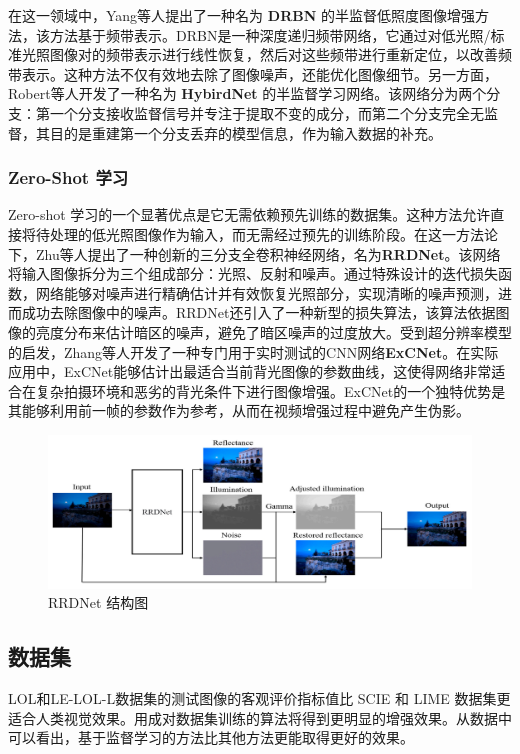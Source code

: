 \documentclass[a4paper]{ctexart}
\begin{document}
	在这一领域中，Yang等人\cite{qiao2021deep}提出了一种名为 \textbf{DRBN} 的半监督低照度图像增强方法，该方法基于频带表示。DRBN是一种深度递归频带网络，它通过对低光照/标准光照图像对的频带表示进行线性恢复，然后对这些频带进行重新定位，以改善频带表示。这种方法不仅有效地去除了图像噪声，还能优化图像细节。另一方面，Robert等人开发了一种名为 \textbf{HybirdNet} 的半监督学习网络\cite{robert2018hybridnet}。该网络分为两个分支：第一个分支接收监督信号并专注于提取不变的成分，而第二个分支完全无监督，其目的是重建第一个分支丢弃的模型信息，作为输入数据的补充。
	
	\subsubsection{Zero-Shot 学习}
	
	Zero-shot 学习的一个显著优点是它无需依赖预先训练的数据集。这种方法允许直接将待处理的低光照图像作为输入，而无需经过预先的训练阶段。在这一方法论下，Zhu等人\cite{zhu2020zero}提出了一种创新的三分支全卷积神经网络，名为\textbf{RRDNet}。该网络将输入图像拆分为三个组成部分：光照、反射和噪声。通过特殊设计的迭代损失函数，网络能够对噪声进行精确估计并有效恢复光照部分，实现清晰的噪声预测，进而成功去除图像中的噪声。RRDNet还引入了一种新型的损失算法，该算法依据图像的亮度分布来估计暗区的噪声，避免了暗区噪声的过度放大。受到超分辨率模型的启发，Zhang等人\cite{zhang2019zero}开发了一种专门用于实时测试的CNN网络\textbf{ExCNet}。在实际应用中，ExCNet能够估计出最适合当前背光图像的参数曲线，这使得网络非常适合在复杂拍摄环境和恶劣的背光条件下进行图像增强。ExCNet的一个独特优势是其能够利用前一帧的参数作为参考，从而在视频增强过程中避免产生伪影。
	
	\begin{figure}[htb]
		\centering 
		\includegraphics[width=0.7\columnwidth]{picture/LLIE/RRDNet/RRDNet}
		\caption{
			\label{fig: RRDNet} 
			RRDNet 结构图
		}
	\end{figure}
	
	\subsection{数据集}
	
	LOL\cite{wei2018deep}和LE-LOL-L\cite{liu2021benchmarking}数据集的测试图像的客观评价指标值比 SCIE\cite{cai2018learning} 和 LIME\cite{guo2016lime} 数据集更适合人类视觉效果。用成对数据集训练的算法将得到更明显的增强效果。从数据中可以看出，基于监督学习的方法比其他方法更能取得更好的效果。
	
\end{document}
